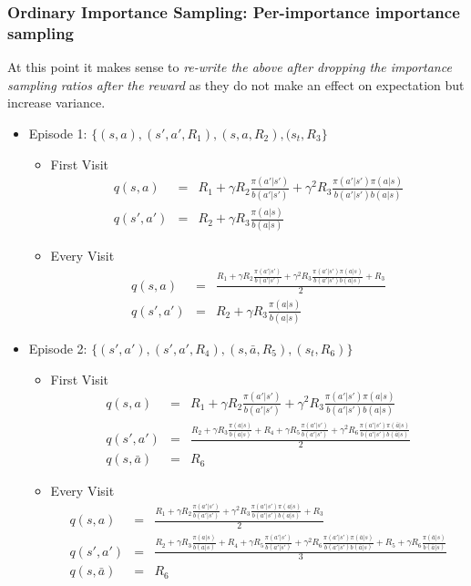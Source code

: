 \documentclass[11pt,a4paper]{article}
\newcommand\bea{\begin{eqnarray}}
\newcommand\eea{\end{eqnarray}}
\begin{document}
\subsubsection{Ordinary Importance Sampling: Per-importance importance sampling}

At this point it makes sense to {\em re-write the above after dropping the importance sampling ratios after the reward} as they do not make an effect on expectation but increase variance.
 
\begin{itemize}
\item Episode 1: $\{(s,a),(s',a',R_1),(s,a,R_2),(s_t,R_3\}$ 
\begin{itemize}
\item First Visit
\bea
q(s,a) &=& R_1 + \gamma R_2 \frac{\pi(a'|s')}{b(a'|s')} +\gamma^2 R_3 \frac{\pi(a'|s') \pi(a|s)}{b(a'|s') b(a|s)} \\
q(s',a') &=& R_2 + \gamma R_3 \frac{\pi(a|s)}{b(a|s)}
\eea
\item Every Visit
\bea
q(s,a) &=& \frac{R_1 + \gamma R_2 \frac{\pi(a'|s')}{b(a'|s')} +\gamma^2 R_3 \frac{\pi(a'|s') \pi(a|s)}{b(a'|s') b(a|s)} +R_3}{2} \\
q(s',a') &=& R_2 + \gamma R_3 \frac{\pi(a|s)}{b(a|s)}
\eea
\end{itemize}
\item  Episode 2: $\{(s',a'),(s',a',R_4),(s,\bar a,R_5),(s_t,R_6)\}$
\begin{itemize}
\item First Visit
\bea
q(s,a) &=&R_1 + \gamma R_2 \frac{\pi(a'|s')}{b(a'|s')} +\gamma^2 R_3 \frac{\pi(a'|s') \pi(a|s)}{b(a'|s') b(a|s)} \\
q(s',a') &=& \frac{R_2 + \gamma R_3 \frac{\pi(a|s)}{b(a|s)} + R_4 + \gamma R_5 \frac{\pi(a'|s') }{b(a'|s') } + \gamma^2 R_6 \frac{\pi(a'|s') \pi(\bar a|s)}{b(a'|s') b(\bar a|s)}}{2} \\
q(s,\bar a) &=& R_6
\eea
\item Every Visit
\bea
q(s,a) &=&  \frac{R_1 + \gamma R_2 \frac{\pi(a'|s')}{b(a'|s')} +\gamma^2 R_3 \frac{\pi(a'|s') \pi(a|s)}{b(a'|s') b(a|s)} +R_3}{2} \\
q(s',a') &=& \frac{R_2 + \gamma R_3 \frac{\pi(a|s)}{b(a|s)} + R_4 + \gamma R_5 \frac{\pi(a'|s') }{b(a'|s') } + \gamma^2 R_6 \frac{\pi(a'|s') \pi(\bar a|s)}{b(a'|s') b(\bar a|s)} + R_5+ \gamma R_6 \frac{ \pi(\bar a|s)}{ b(\bar a|s)}}{3} \\
q(s,\bar a) &=& R_6
\eea
\end{itemize}
\end{itemize}
\end{document}
